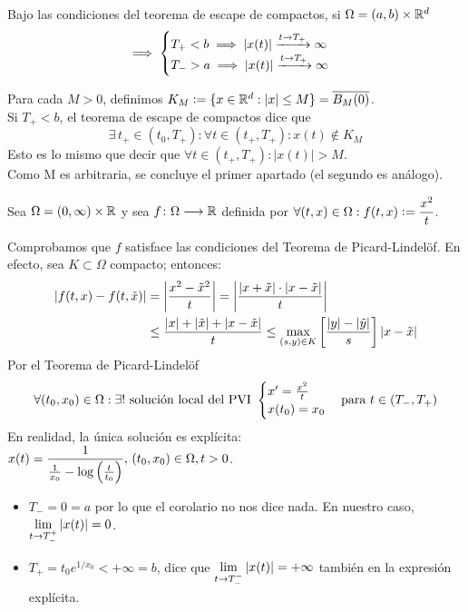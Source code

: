 \begin{cor}
	Bajo las condiciones del teorema de escape de compactos, si $\Omega = (a, b) \times \mathbb{R}^d$
	\[\implies \begin{cases}
		T_+ < b \implies \left|x(t)\right| \xrightarrow{t\to T_+} \infty \\
		T_- > a \implies \left|x(t)\right| \xrightarrow{t\to T_+} \infty \\
	\end{cases}\]
	\begin{dem}
		Para cada $M>0$, definimos $K_M\vcentcolon= \{x \in \mathbb{R}^d : |x|\leq M \} = \overline{B_M(0)}$.\\
		Si $T_+<b$, el teorema de escape de compactos dice que 
		\[\exists \, t_+ \in (t_0,T_+) : \forall t \in (t_+,T_+) : x(t)\notin K_M\]
		Esto es lo mismo que decir que $\forall t \in (t_+,T_+) : |x(t)|>M$.\\
		Como M es arbitraria, se concluye el primer apartado (el segundo es análogo).
	\end{dem}
\end{cor}

\begin{ejem}
	Sea $\Omega = (0, \infty ) \times \mathbb{R}$ y sea $f \colon \Omega \longrightarrow \mathbb{R}$ definida por $\displaystyle \forall (t,x) \in \Omega : f(t,x)\vcentcolon=\frac{x^2}{t}$.
	
	Comprobamos que $f$ satisface las condiciones del Teorema de Picard-Lindelöf. En efecto, sea $K \subset \Omega$ compacto; entonces:
	\[\begin{aligned}
		\left|f(t,x)-f(t,\Tilde{x})\right| &= \left | \frac{x^2-\Tilde{x}^2}{t}\right | = \left | \frac{|x+\Tilde{x}|\cdot|x-\Tilde{x}|}{t}\right | \\
		&\leq \frac{|x|+|\Tilde{x}| + |x-\Tilde{x}|}{t} \leq \displaystyle \max_{(s,y)\in K}\left [ \frac{|y|-|\Tilde{y}|}{s}\right ] |x-\Tilde{x}|
	\end{aligned}\]
	Por el Teorema de Picard-Lindelöf
	\[\forall (t_0,x_0)\in \Omega : \exists ! \text{ solución local del PVI }\displaystyle \begin{cases} x'=\frac{x^2}{t} \\ x(t_0)=x_0 \end{cases} \text{para } t \in (T_-,T_+)\]
	En realidad, la única solución es explícita:
	$\displaystyle x(t)=\frac{1}{\frac{1}{x_0}-\log \left(\frac{t}{t_0} \right)}, \, (t_0,x_0)\in \Omega, t>0$.
	
	\begin{itemize}
    	\item $T_-=0=a$ por lo que el corolario no nos dice nada. En nuestro caso, $\displaystyle \lim_{t\to T_-^+} |x(t)| = 0$.
    	\item $T_+=t_0 e^{1/x_0} < + \infty = b$, dice que $\displaystyle \lim_{t\to T_-^-}|x(t)| = + \infty$ también en la expresión explícita. 
	\end{itemize}
\end{ejem}

